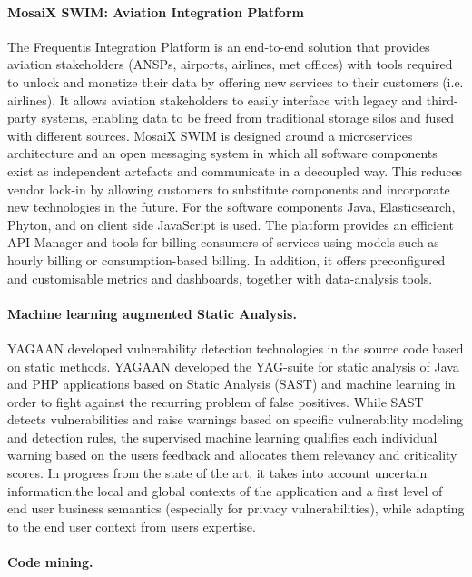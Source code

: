 \documentclass[a4paper,11pt]{article}
\begin{document}
\paragraph{\FRQshort{} MosaiX SWIM: Aviation Integration Platform}
\label{sec:swim}
The Frequentis Integration Platform is an end-to-end solution that provides aviation stakeholders (ANSPs, airports, airlines, met offices) with tools required to unlock and monetize their data by offering new services to their customers (i.e. airlines). It allows aviation stakeholders to easily interface with legacy and third-party systems, enabling data to be freed from traditional storage silos and fused with different sources. MosaiX SWIM is designed around a microservices architecture and an open messaging system in which all software components exist as independent artefacts and communicate in a decoupled way. This reduces vendor lock-in by allowing customers to substitute components and incorporate new technologies in the future. For the software components  Java, Elasticsearch, Phyton, and on client side JavaScript is used. The platform provides an efficient API Manager and tools for billing consumers of services using models such as hourly billing or consumption-based billing. In addition, it offers preconfigured and customisable metrics and dashboards, together with data-analysis tools.



\paragraph{\YAGshort{} Machine learning augmented Static Analysis.}

YAGAAN developed vulnerability detection technologies in the source code based on static methods. YAGAAN developed the YAG-suite for static analysis of Java and PHP applications based on Static Analysis (SAST) and machine learning in order to fight against the recurring problem of false positives. While SAST detects vulnerabilities and raise warnings based on specific vulnerability modeling and detection rules, the supervised machine learning qualifies each individual warning based on the users feedback and allocates them
relevancy and criticality scores. In progress from the state of the art, it takes into account uncertain information,the local and global contexts of the application and a first level of end user business semantics (especially for privacy vulnerabilities), while adapting to the end user context from users expertise. 

\paragraph{\YAGshort{} Code mining.}
\end{document}
